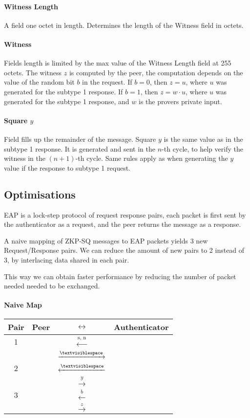 \paragraph{Witness Length} A field one octet in length. Determines the length of the Witness field in octets.

\paragraph{Witness} Fields length is limited by the max value of the Witness Length field at 255 octets.
The witness $z$ is computed by the peer, the computation depends on the value of the random bit $b$ in the request.
If $b=0$, then $z = u$, where $u$ was generated for the subtype 1 response.
If $b=1$, then $z = w \cdot u$,  where $u$ was generated for the subtype 1 response, and $w$ is the provers private input.

\paragraph{Square $y$} Field fills up the remainder of the message. 
Square $y$ is the same value as in the subtype 1 response.
It is generated and sent in the $n$-th cycle, to help verify the witness in the $(n+1)$-th cycle.
Same rules apply as when generating the $y$ value if the response to subtype 1 request.

\subsection{Optimisations}
EAP is a lock-step protocol of request response pairs, each packet is first sent by the authenticator as a request, and the peer returns the message as a response. %

A naive mapping of ZKP-SQ messages to EAP packets yields 3 new Request/Response pairs. 
We can reduce the amount of new pairs to 2 instead of 3, by interlacing data shared in each pair.

This way we can obtain faster performance by reducing the number of packet needed needed to be exchanged.

\paragraph{Naive Map}

\begin{center}
	\begin{tabular}{c|rcl}
	Pair & Peer  & $\leftrightarrow$ & Authenticator \\
	\hline
	1 & & $\xleftarrow{\text{s, n}}$ &\\
	&& $\xrightarrow{\textvisiblespace}$&\\
	\hline
	2 & & $\xleftarrow{\textvisiblespace}$&\\
	&& $\xrightarrow{y}$&\\
	\hline
	3 & & $\xleftarrow{b}$&\\
	&& $\xrightarrow{z}$&\\
	\hline
	\end{tabular}
\end{center}


